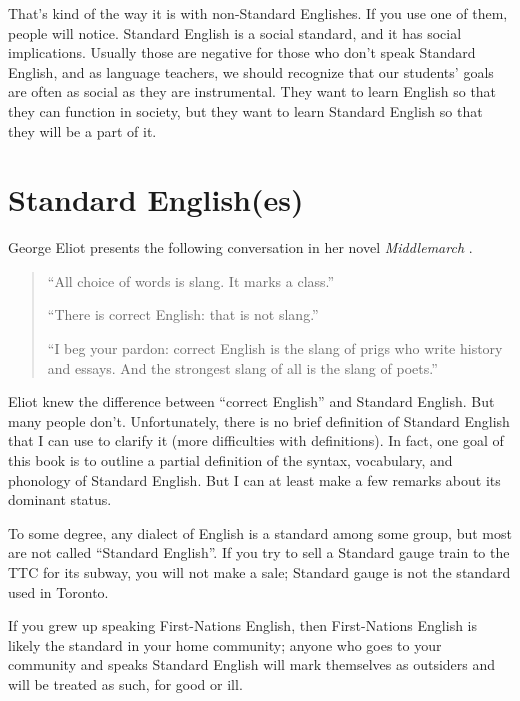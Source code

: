 That's kind of the way it is with non-Standard Englishes. If you use one of them, people will notice. Standard English is a social standard, and it has social implications. Usually those are negative for those who don't speak Standard English, and as language teachers, we should recognize that our students' goals are often as social as they are instrumental. They want to learn English so that they can function in society, but they want to learn Standard English so that they will be a part of it.


\section{Standard English(es)}\label{sec:standard}

George Eliot presents the following conversation in her novel \textit{Middlemarch} \citep{Eliot1872Middlemarch}.

\begin{quote}
    \enquote{All choice of words is slang. It marks a class.}

    \enquote{There is correct English: that is not slang.}

    \enquote{I beg your pardon: correct English is the slang of prigs who write history and essays. And the strongest slang of all is the slang of poets.}
\end{quote}


Eliot knew the difference between \enquote{correct English} and Standard English. But many people don't. Unfortunately, there is no brief definition of Standard English that I can use to clarify it (more difficulties with definitions). In fact, one goal of this book is to outline a partial definition of the syntax, vocabulary, and phonology of Standard English. But I can at least make a few remarks about its dominant status.

To some degree, any dialect of English is a standard among some group, but most are not called \enquote{Standard English}. If you try to sell a Standard gauge train to the TTC for its subway, you will not make a sale; Standard gauge is not the standard used in Toronto.

If you grew up speaking First-Nations English, then First-Nations English is likely the standard in your home community; anyone who goes to your community and speaks Standard English will mark themselves as outsiders and will be treated as such, for good or ill.

